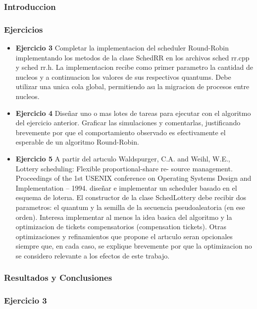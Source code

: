 
\subsubsection{Introduccion}

\subsubsection{Ejercicios}
\begin{itemize}
 \item 
\textbf{Ejercicio 3}  Completar la implementacion del scheduler Round-Robin implementando los
metodos de la clase SchedRR en los archivos sched rr.cpp y sched rr.h. La implementacion
recibe como primer parametro la cantidad de nucleos y a continuacion los valores de sus
respectivos quantums. Debe utilizar una unica cola global, permitiendo ası la migracion de
procesos entre nucleos.
\item \textbf{Ejercicio 4} Diseñar uno o mas lotes de tareas para ejecutar con el algoritmo del ejercicio
anterior. Graficar las simulaciones y comentarlas, justificando brevemente por que el comportamiento 
observado es efectivamente el esperable de un algoritmo Round-Robin.
\item \textbf{Ejercicio 5} A partir del artıculo
Waldspurger, C.A. and Weihl, W.E., Lottery scheduling: Flexible proportional-share re-
source management. Proceedings of the 1st USENIX conference on Operating Systems
Design and Implementation – 1994.
diseñar e implementar un scheduler basado en el esquema de loterıa. El constructor de la
clase SchedLottery debe recibir dos parametros: el quantum y la semilla de la secuencia
pseudoaleatoria (en ese orden). Interesa implementar al menos la idea basica del algoritmo
y la optimizacion de tickets compensatorios (compensation tickets). Otras optimizaciones y
refinamientos que propone el artıculo seran opcionales siempre que, en cada caso, se explique
brevemente por que la optimizacion no se considero relevante a los efectos de este trabajo.

\end{itemize}


\subsubsection{Resultados y Conclusiones}

\subsubsection[]{Ejercicio 3}

